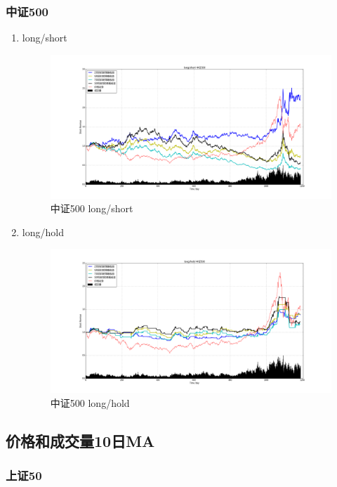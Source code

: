 \documentclass[12pt,a4paper]{article}
\begin{document}
\subsubsection{中证500}
\begin{enumerate}
\item long/short 
\begin{figure}[H]
	\centering
	\includegraphics[width=1.0\textwidth]{img_r_7/zz500.png}
	\caption{中证500 long/short }
\end{figure}
\item long/hold 
\begin{figure}[H]
	\centering
	\includegraphics[width=1.0\textwidth]{img_r_7/zz500_1.png}
	\caption{中证500 long/hold}
\end{figure}
\end{enumerate}


\subsection{价格和成交量10日MA}
\subsubsection{上证50}
\end{document}
